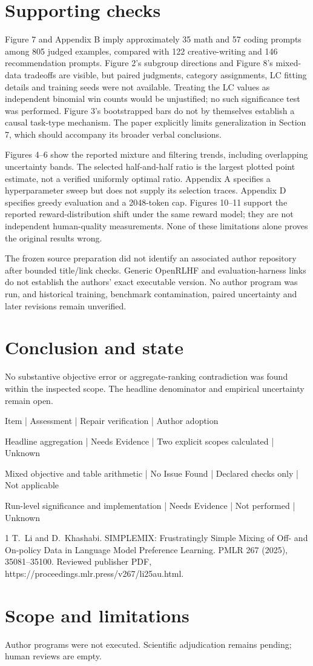 \documentclass[10pt]{article}
\begin{document}
\section*{Supporting checks}
Figure 7 and Appendix B imply approximately 35 math and 57 coding prompts among 805 judged examples, compared with 122 creative-writing and 146 recommendation prompts. Figure 2’s subgroup directions and Figure 8’s mixed-data tradeoffs are visible, but paired judgments, category assignments, LC fitting details and training seeds were not available. Treating the LC values as independent binomial win counts would be unjustified; no such significance test was performed. Figure 3’s bootstrapped bars do not by themselves establish a causal task-type mechanism. The paper explicitly limits generalization in Section 7, which should accompany its broader verbal conclusions.\par
Figures 4–6 show the reported mixture and filtering trends, including overlapping uncertainty bands. The selected half-and-half ratio is the largest plotted point estimate, not a verified uniformly optimal ratio. Appendix A specifies a hyperparameter sweep but does not supply its selection traces. Appendix D specifies greedy evaluation and a 2048-token cap. Figures 10–11 support the reported reward-distribution shift under the same reward model; they are not independent human-quality measurements. None of these limitations alone proves the original results wrong.\par
The frozen source preparation did not identify an associated author repository after bounded title/link checks. Generic OpenRLHF and evaluation-harness links do not establish the authors’ exact executable version. No author program was run, and historical training, benchmark contamination, paired uncertainty and later revisions remain unverified.\par
\section*{Conclusion and state}
No substantive objective error or aggregate-ranking contradiction was found within the inspected scope. The headline denominator and empirical uncertainty remain open.\par
Item | Assessment | Repair verification | Author adoption\par
Headline aggregation | Needs Evidence | Two explicit scopes calculated | Unknown\par
Mixed objective and table arithmetic | No Issue Found | Declared checks only | Not applicable\par
Run-level significance and implementation | Needs Evidence | Not performed | Unknown\par
1 T. Li and D. Khashabi. SIMPLEMIX: Frustratingly Simple Mixing of Off- and On-policy Data in Language Model Preference Learning. PMLR 267 (2025), 35081–35100. Reviewed publisher PDF, https://proceedings.mlr.press/v267/li25au.html.\par
\section*{Scope and limitations}
Author programs were not executed. Scientific adjudication remains pending; human reviews are empty.\par
\end{document}
